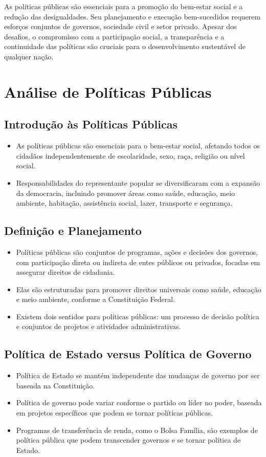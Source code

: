 \documentclass[
   article,       
   12pt,          
   oneside,       
   a4paper,       
   english,       
   brazil,        
   sumario=tradicional
   ]{abntex2}
\begin{document}
As políticas públicas são essenciais para a promoção do bem-estar social e a redução das desigualdades. Seu planejamento e execução bem-sucedidos requerem esforços conjuntos de governos, sociedade civil e setor privado. Apesar dos desafios, o compromisso com a participação social, a transparência e a continuidade das políticas são cruciais para o desenvolvimento sustentável de qualquer nação.
\section{Análise de Políticas Públicas}
\subsection{Introdução às Políticas Públicas}
\begin{itemize}
    \item As políticas públicas são essenciais para o bem-estar social, afetando todos os cidadãos independentemente de escolaridade, sexo, raça, religião ou nível social. 
    \item Responsabilidades do representante popular se diversificaram com a expansão da democracia, incluindo promover áreas como saúde, educação, meio ambiente, habitação, assistência social, lazer, transporte e segurança.
\end{itemize}

\subsection{Definição e Planejamento}
\begin{itemize}
    \item Políticas públicas são conjuntos de programas, ações e decisões dos governos, com participação direta ou indireta de entes públicos ou privados, focadas em assegurar direitos de cidadania.
    \item Elas são estruturadas para promover direitos universais como saúde, educação e meio ambiente, conforme a Constituição Federal.
    \item Existem dois sentidos para políticas públicas: um processo de decisão política e conjuntos de projetos e atividades administrativas.
\end{itemize}

\subsection{Política de Estado versus Política de Governo}
\begin{itemize}
    \item Política de Estado se mantém independente das mudanças de governo por ser baseada na Constituição.
    \item Política de governo pode variar conforme o partido ou líder no poder, baseada em projetos específicos que podem se tornar políticas públicas.
    \item Programas de transferência de renda, como o Bolsa Família, são exemplos de política pública que podem transcender governos e se tornar política de Estado.
\end{itemize}
\end{document}
